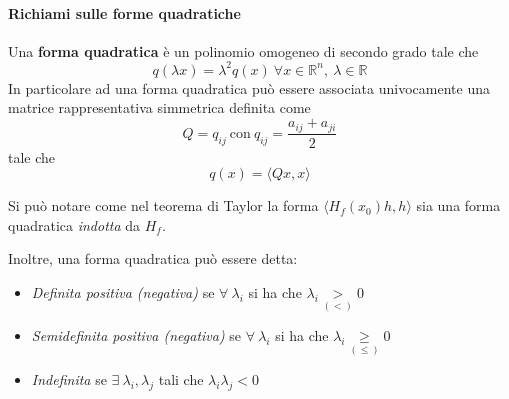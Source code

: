 \paragraph{Richiami sulle forme quadratiche} Una \textbf{forma quadratica} è un polinomio omogeneo di secondo grado tale che
\begin{equation}
    q(\lambda x)=\lambda^2 q(x)\ \forall x \in \mathbb{R}^n,\ \lambda \in \mathbb{R}
\end{equation}
In particolare ad una forma quadratica può essere associata univocamente una matrice rappresentativa simmetrica definita come 
\begin{equation}
    Q=q_{ij}\ \text{con}\ q_{ij}=\frac{a_{ij}+a_{ji}}{2}
\end{equation}
tale che
\begin{equation}
    q(x)=\langle Qx, x \rangle
\end{equation}
\begin{oss}
    Si può notare come nel teorema di Taylor la forma $\langle H_f(x_0)h, h \rangle$ sia una forma quadratica \textit{indotta} da $H_f$.
\end{oss}
Inoltre, una forma quadratica può essere detta:
\begin{itemize}
    \item \textit{Definita positiva (negativa)} se $\forall\ \lambda_i$ si ha che $\lambda_i \underset{(<)}{>}0$
    \item \textit{Semidefinita positiva (negativa)} se $\forall\ \lambda_i$ si ha che $\lambda_i \underset{(\leq)}{\geq}0$
    \item \textit{Indefinita} se $\exists\ \lambda_i, \lambda_j$ tali che $\lambda_i\lambda_j<0$
\end{itemize}
